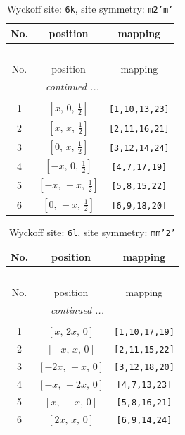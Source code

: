\documentclass[fleqn,8pt]{jsarticle}
\begin{document}
\renewcommand{\arraystretch}{1.2}
\begin{longtable}{ccc}
\caption{Wyckoff site: {\tt 6k}, site symmetry: {\tt m2'm'}}
 \\
 \hline \hline
No. & position & mapping \\ \hline \endfirsthead

\multicolumn{2}{l}{\tablename\ \thetable{}} \\
 \hline \hline
No. & position & mapping \\ \hline \endhead

 \hline \hline
\multicolumn{2}{r}{\footnotesize\it continued ...} \\ \endfoot

 \hline \hline
\multicolumn{2}{r}{} \\ \endlastfoot

1 & $\left[ x,\, 0,\, \frac{1}{2} \right]$ & {\tt [1,10,13,23]} \\ \hline
2 & $\left[ x,\, x,\, \frac{1}{2} \right]$ & {\tt [2,11,16,21]} \\ \hline
3 & $\left[ 0,\, x,\, \frac{1}{2} \right]$ & {\tt [3,12,14,24]} \\ \hline
4 & $\left[ - x,\, 0,\, \frac{1}{2} \right]$ & {\tt [4,7,17,19]} \\ \hline
5 & $\left[ - x,\, - x,\, \frac{1}{2} \right]$ & {\tt [5,8,15,22]} \\ \hline
6 & $\left[ 0,\, - x,\, \frac{1}{2} \right]$ & {\tt [6,9,18,20]} \\
\end{longtable}
\renewcommand{\arraystretch}{1.2}
\begin{longtable}{ccc}
\caption{Wyckoff site: {\tt 6l}, site symmetry: {\tt mm'2'}}
 \\
 \hline \hline
No. & position & mapping \\ \hline \endfirsthead

\multicolumn{2}{l}{\tablename\ \thetable{}} \\
 \hline \hline
No. & position & mapping \\ \hline \endhead

 \hline \hline
\multicolumn{2}{r}{\footnotesize\it continued ...} \\ \endfoot

 \hline \hline
\multicolumn{2}{r}{} \\ \endlastfoot

1 & $\left[ x,\, 2 x,\, 0 \right]$ & {\tt [1,10,17,19]} \\ \hline
2 & $\left[ - x,\, x,\, 0 \right]$ & {\tt [2,11,15,22]} \\ \hline
3 & $\left[ - 2 x,\, - x,\, 0 \right]$ & {\tt [3,12,18,20]} \\ \hline
4 & $\left[ - x,\, - 2 x,\, 0 \right]$ & {\tt [4,7,13,23]} \\ \hline
5 & $\left[ x,\, - x,\, 0 \right]$ & {\tt [5,8,16,21]} \\ \hline
6 & $\left[ 2 x,\, x,\, 0 \right]$ & {\tt [6,9,14,24]} \\
\end{longtable}
\end{document}
